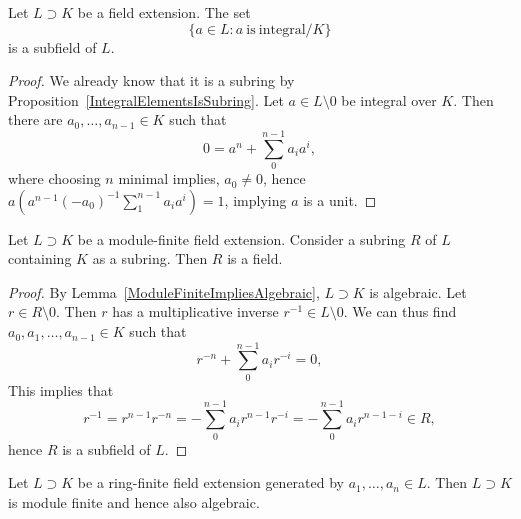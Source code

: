 \begin{proposition}
    Let $L\supset K$ be a field extension. The set 
    $$\{a\in L: a \ \mathrm{is}\ \mathrm{integral}/K\}$$
    is a subfield of $L$.
\end{proposition}
\begin{proof}
    We already know that it is a subring by Proposition~\ref{IntegralElementsIsSubring}. Let $a\in L\setminus 0$ be integral over $K$. Then there are $a_0,\dots,a_{n-1}\in K$ such that 
    $$0= a^n+\sum_0^{n-1} a_ia^{i},$$
    where choosing $n$ minimal implies, $a_0 \neq 0$, hence 
    $a\left(a^{n-1}(-a_0)^{-1}\sum_1^{n-1} a_ia^{i}\right) = 1$, implying $a$ is a unit. 
\end{proof}
\begin{proposition}
    Let $L\supset K$ be a module-finite field extension. Consider a subring $R$ of $L$ containing $K$ as a subring. Then $R$ is a field. 
\end{proposition}
\begin{proof}
    By Lemma~\ref{ModuleFiniteImpliesAlgebraic}, $L\supset K$ is algebraic. Let $r\in R\setminus 0$. Then $r$ has a multiplicative inverse $r^{-1}\in L\setminus 0$. We can thus find $a_0,a_1,\dots, a_{n-1}\in K$ such that 
    $$r^{-n}+\sum_0^{n-1} a_ir^{-i} = 0,$$
    This implies that 
    $$r^{-1}=r^{n-1}r^{-n} = -\sum_0^{n-1}a_i r^{n-1}r^{-i} = -\sum_0^{n-1} a_ir^{n-1-i}\in R,$$
    hence $R$ is a subfield of $L$. 
\end{proof}
\begin{theorem}
    Let $L\supset K$ be a ring-finite field extension generated by $a_1,\dots,a_n\in L$. Then $L\supset K$ is module finite and hence also algebraic.   
\end{theorem}
